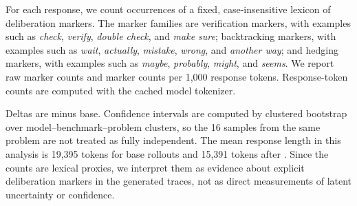 For each response, we count occurrences of a fixed, case-insensitive lexicon of
deliberation markers. The marker families are verification markers, with
examples such as \textit{check}, \textit{verify}, \textit{double check}, and
\textit{make sure}; backtracking markers, with examples such as \textit{wait},
\textit{actually}, \textit{mistake}, \textit{wrong}, and \textit{another way};
and hedging markers, with examples such as \textit{maybe}, \textit{probably},
\textit{might}, and \textit{seems}. We report raw marker counts and marker
counts per 1,000 response tokens. Response-token counts are computed with the
cached model tokenizer.



Deltas are \opsd{} minus base. Confidence intervals are computed by clustered
bootstrap over model--benchmark--problem clusters, so the 16 samples from the
same problem are not treated as fully independent. The mean response length in
this analysis is 19,395 tokens for base rollouts and 15,391 tokens after
\opsd{}. Since the counts are lexical proxies, we interpret them as evidence
about explicit deliberation markers in the generated traces, not as direct
measurements of latent uncertainty or confidence.
